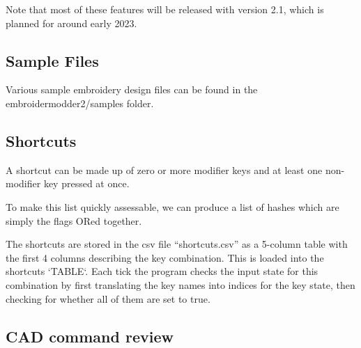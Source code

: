 \documentclass{report}
\begin{document}
Note that most of these features will be released with version 2.1, which is planned for around early 2023.

\subsection{Sample Files}

Various sample embroidery design files can be found in the embroidermodder2/samples folder.

\subsection{Shortcuts}

A shortcut can be made up of zero or more modifier keys and at least one non-modifier key pressed at once.

To make this list quickly assessable, we can produce a list of hashes which are simply the flags ORed together.

The shortcuts are stored in the csv file ``shortcuts.csv''
as a 5-column table with the first 4 columns describing
the key combination. This is loaded into the shortcuts
`TABLE`. Each tick the program checks the input state for
this combination by first translating the key names into
indices for the key state, then checking for whether all
of them are set to true.

\subsection{CAD command review}
\end{document}
